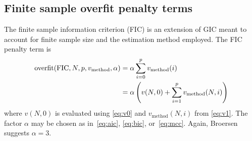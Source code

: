 \documentclass[12pt,letterpaper]{article}
\begin{document}
\subsection*{Finite sample overfit penalty terms}

The finite sample information criterion (FIC) is an extension of GIC meant to
account for finite sample size and the estimation method employed.  The FIC
penalty term is
\begin{align}
    \text{overfit}\!\left(\text{FIC},N,p,v_\text{method},\alpha\right)
    &=
    \alpha \sum_{i=0}^{p} v_\text{method}\!\left(i\right)
    \notag
    \\
    &=
    \alpha\left(
      v\!\left(N,0\right)
    + \sum_{i=1}^{p} v_\text{method}\!\left(N,i\right)
    \right)
\end{align}
where $v\!\left(N,0\right)$ is evaluated using \eqref{eq:v0} and
$v_\text{method}\!\left(N,i\right)$ from \eqref{eq:v1}.  The factor $\alpha$
may be chosen as in~\eqref{eq:aic}, \eqref{eq:bic}, or~\eqref{eq:mcc}.  Again,
Broersen suggests $\alpha = 3$.
\end{document}
